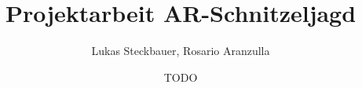\documentclass[oneside]{ausarbeitung}
\begin{document}

\Projektbericht
\Informatik


\title{Projektarbeit AR-Schnitzeljagd}
\author{Lukas Steckbauer, Rosario Aranzulla}
\date{TODO}

\examinerIsAProfessorfalse

\maketitle
\cleardoublepage
{}
\setcounter{page}{1}
\makeaffirmation
\cleardoublepage

\begin{abstract}

\end{abstract}

\cleardoublepage
\tableofcontents

\listoffigures
\listoftables
\lstlistoflistings
\listofabbreviations
\begin{acronym}[Bsp.]

\end{acronym}
\cleardoublepage
{}
\setcounter{page}{1}
















\appendix
\printbibliography[heading=bibintoc]




\end{document}
